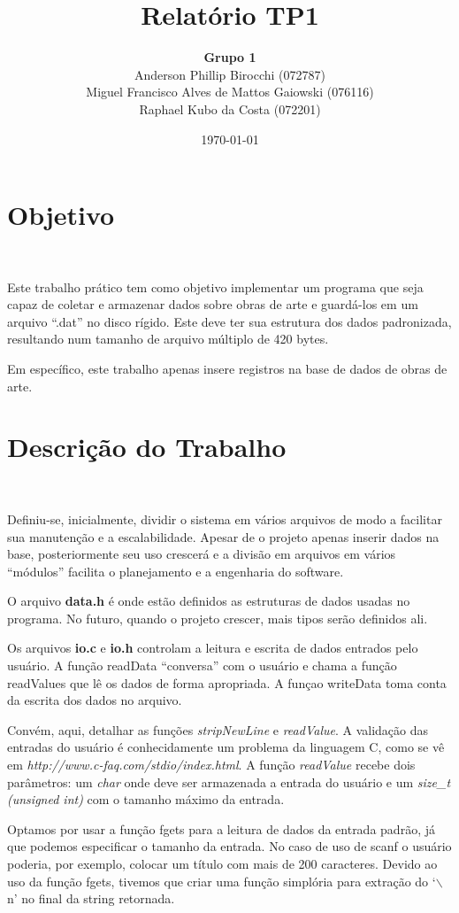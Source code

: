 \documentclass{article}
\title{\textbf{Relatório TP1}}
\author{\textbf{Grupo 1} \\
  Anderson Phillip Birocchi (072787) \\
  Miguel Francisco Alves de Mattos Gaiowski (076116) \\
  Raphael Kubo da Costa (072201)}
\date{\today}
\begin{document}
\maketitle

\section*{Objetivo}\

Este trabalho prático tem como objetivo implementar um programa que seja capaz de coletar e armazenar dados sobre obras de arte e guardá-los em um arquivo ``.dat'' no disco rígido. Este deve ter sua estrutura dos dados padronizada, resultando num tamanho de arquivo múltiplo de 420 bytes.

Em específico, este trabalho apenas insere registros na base de dados de obras de arte.

\section*{Descrição do Trabalho}\

Definiu-se, inicialmente, dividir o sistema em vários arquivos de modo a facilitar sua manutenção e a escalabilidade. Apesar de o projeto apenas inserir dados na base, posteriormente seu uso crescerá e a divisão em arquivos em vários ``módulos'' facilita o planejamento e a engenharia do software.

O arquivo \textbf{data.h} é onde estão definidos as estruturas de dados usadas no programa. No futuro, quando o projeto crescer, mais tipos serão definidos ali.

Os arquivos \textbf{io.c} e \textbf{io.h} controlam a leitura e escrita de dados entrados pelo usuário. A função readData ``conversa'' com o usuário e chama a função readValues que lê os dados de forma apropriada. A funçao writeData toma conta da escrita dos dados no arquivo.

Convém, aqui, detalhar as funções \textit{stripNewLine} e \textit{readValue}. A validação das entradas do usuário é conhecidamente um problema da linguagem C, como se vê em \textit{http://www.c-faq.com/stdio/index.html}. A função \textit{readValue} recebe dois parâmetros: um \textit{char} onde deve ser armazenada a entrada do usuário e um \textit{size\_t (unsigned int)} com o tamanho máximo da entrada.

Optamos por usar a função fgets para a leitura de dados da entrada padrão, já que podemos especificar o tamanho da entrada. No caso de uso de scanf o usuário poderia, por exemplo, colocar um título com mais de 200 caracteres. Devido ao uso da função fgets, tivemos que criar uma função simplória para extração do `$\backslash$n' no final da string retornada.
\end{document}
